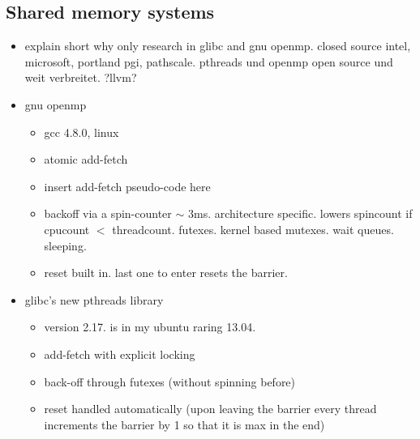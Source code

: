 \documentclass[a4paper, 10pt]{article}
\begin{document}
\subsection{Shared memory systems}
\begin{itemize}
	\item explain short why only research in glibc and gnu openmp. closed source intel, microsoft, portland pgi, pathscale. pthreads und openmp open source und weit verbreitet. ?llvm?
	\item gnu openmp
		\begin{itemize}
			\item gcc 4.8.0, linux
			\item atomic add-fetch
			\item insert add-fetch pseudo-code here
			\item backoff via a spin-counter $\sim$ 3ms. architecture specific. lowers spincount if cpucount $<$ threadcount. futexes. kernel based mutexes. wait queues. sleeping.
			\item reset built in. last one to enter resets the barrier.
		\end{itemize}
	\item glibc's new pthreads library
		\begin{itemize}
			\item version 2.17. is in my ubuntu raring 13.04.
			\item add-fetch with explicit locking
			\item back-off through futexes (without spinning before)
			\item reset handled automatically (upon leaving the barrier every thread increments the barrier by 1 so that it is max in the end)
		\end{itemize}
\end{itemize}
\end{document}
